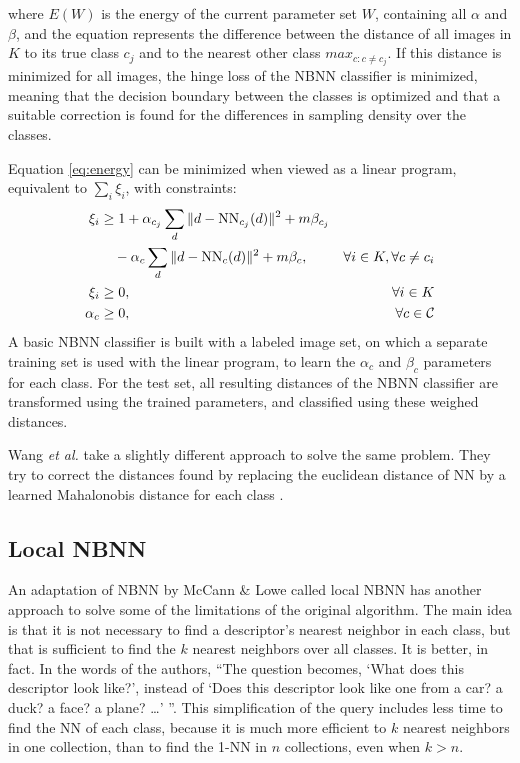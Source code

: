 where $E(W)$ is the energy of the current parameter set $W$, containing all $\alpha$ and $\beta$, and the equation represents the difference between the distance of all images in $K$ to its true class $c_j$ and to the nearest other class $max_{c:c\neq c_j}$. If this distance is minimized for all images, the hinge loss of the NBNN classifier is minimized, meaning that the decision boundary between the classes is optimized and that a suitable correction is found for the differences in sampling density over the classes.

Equation \eqref{eq:energy} can be minimized when viewed as a linear program, equivalent to $\sum_i \xi_i$, with constraints:
\begin{align}
    \xi_i &\geq 1 +\alpha_{c_j} \sum_d \|d - \text{NN}_{c_j}(d)\|^2 + m\beta_{c_j}&\notag\\
    \label{eq:linprog1}
    &\quad-\alpha_{c} \sum_d \|d - \text{NN}_{c}(d)\|^2 + m\beta_{c}, &\forall i \in K, \forall c \neq c_i\\
    \label{eq:linprog2}
    \xi_i &\geq 0, &\forall i \in K\\
    \label{eq:linprog3}
    \alpha_c &\geq 0, &\forall c \in \mathcal{C}
\end{align}
A basic NBNN classifier is built with a labeled image set, on which a separate training set is used with the linear program, to learn the $\alpha_c$ and $\beta_c$ parameters for each class. For the test set, all resulting distances of the NBNN classifier are transformed using the trained parameters, and classified using these weighed distances.

Wang \emph{et al.} take a slightly different approach to solve the same problem. They try to correct the distances found by replacing the euclidean distance of NN by a learned Mahalonobis distance for each class .


\subsection{Local NBNN} %
\label{sub:local_nbnn}

An adaptation of NBNN by McCann \& Lowe called local NBNN has another approach to solve some of the limitations of the original algorithm. The main idea is that it is not necessary to find a descriptor's nearest neighbor in each class, but that is sufficient to find the $k$ nearest neighbors over all classes. It is better, in fact. In the words of the authors, ``The question becomes, `What does this descriptor look like?', instead of `Does this descriptor look like one from a car? a duck? a face? a plane? \ldots' ''. This simplification of the query includes less time to find the NN of each class, because it is much more efficient to $k$ nearest neighbors in one collection, than to find the 1-NN in $n$ collections, even when $k>n$.

